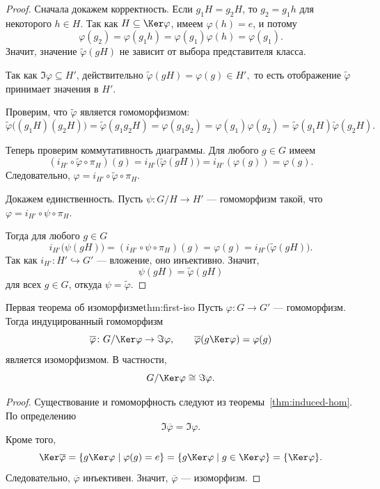 \begin{proof}
	Сначала докажем корректность.
	Если $g_1H=g_2H$, то $g_2=g_1h$ для некоторого $h\in H$. Так как
	$H\subseteq \Ker\varphi$, имеем $\varphi(h)=e$, и потому
	\[
	\varphi(g_2)=\varphi(g_1h)=\varphi(g_1)\varphi(h)=\varphi(g_1).
	\]
	Значит, значение $\widetilde\varphi(gH)$ не зависит от выбора представителя класса.
	
	Так как $\Im\varphi\subseteq H'$, действительно $\widetilde\varphi(gH)=\varphi(g)\in H',$ то есть отображение $\widetilde\varphi$ принимает значения в $H'$.
	
	Проверим, что $\widetilde\varphi$ является гомоморфизмом:
	\[
	\widetilde\varphi\bigl((g_1H)(g_2H)\bigr)
	=
	\widetilde\varphi(g_1g_2H)
	=
	\varphi(g_1g_2)
	=
	\varphi(g_1)\varphi(g_2)
	=
	\widetilde\varphi(g_1H)\widetilde\varphi(g_2H).
	\]
	
	Теперь проверим коммутативность диаграммы. Для любого $g\in G$ имеем
	\[
	(i_{H'}\circ \widetilde\varphi\circ \pi_H)(g)
	=
	i_{H'}\bigl(\widetilde\varphi(gH)\bigr)
	=
	i_{H'}(\varphi(g))
	=
	\varphi(g).
	\]
	Следовательно, 	$\varphi = i_{H'}\circ \widetilde\varphi\circ \pi_H.$
	
	Докажем единственность. Пусть $\psi\colon G/H\to H'$ --- гомоморфизм такой, что $\varphi = i_{H'}\circ \psi\circ \pi_H.$
	
	Тогда для любого $g\in G$
	\[
	i_{H'}\bigl(\psi(gH)\bigr)
	=
	(i_{H'}\circ \psi\circ \pi_H)(g)
	=
	\varphi(g)
	=
	i_{H'}\bigl(\widetilde\varphi(gH)\bigr).
	\]
	Так как $i_{H'}\colon H'\hookrightarrow G'$ --- вложение, оно инъективно. Значит,
	\[
	\psi(gH)=\widetilde\varphi(gH)
	\]
	для всех $g\in G$, откуда $\psi=\widetilde\varphi$.
\end{proof}

\begin{Theorem}{Первая теорема об изоморфизме}{thm:first-iso}
	Пусть $\varphi\colon G\to G'$ --- гомоморфизм. Тогда индуцированный гомоморфизм
	\[
	\overline\varphi\colon G/\Ker\varphi \to \Im\varphi,
	\qquad
	\overline\varphi(g\Ker\varphi)=\varphi(g)
	\]
	является изоморфизмом. В частности,
	\[
	G/\Ker\varphi \cong \Im\varphi.
	\]
\end{Theorem}

\begin{proof}
	Существование и гомоморфность следуют из теоремы~\ref{thm:induced-hom}. По определению
	\[
	\Im\overline\varphi=\Im\varphi.
	\]
	Кроме того,
	\[
	\Ker\overline\varphi = \{g\Ker\varphi \mid \varphi(g)=e\} = \{g\Ker\varphi \mid g\in \Ker\varphi\} = \{\Ker\varphi\}.
	\]
	Следовательно, $\overline\varphi$ инъективен. Значит, $\overline\varphi$ --- изоморфизм.
\end{proof}

